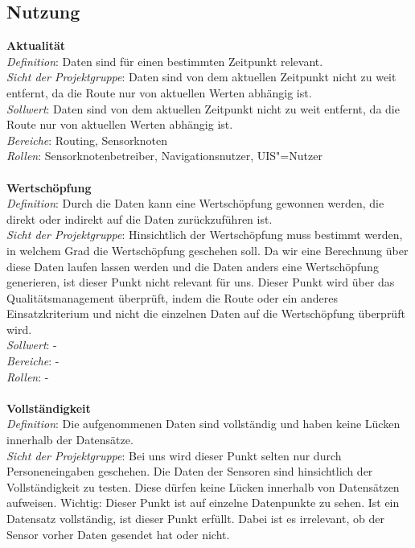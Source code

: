\subsection{Nutzung}
\textbf{Aktualität}\\
\textit{Definition}: Daten sind für einen bestimmten Zeitpunkt relevant. \\
\textit{Sicht der Projektgruppe}: Daten sind von dem aktuellen Zeitpunkt nicht zu weit entfernt, da die Route nur von aktuellen Werten abhängig ist.  \\
\textit{Sollwert}: Daten sind von dem aktuellen Zeitpunkt nicht zu weit entfernt, da die Route nur von aktuellen Werten abhängig ist. \\
\textit{Bereiche}: Routing, Sensorknoten\\
\textit{Rollen}: Sensorknotenbetreiber, Navigationsnutzer, UIS"=Nutzer\\
\\
\textbf{Wertschöpfung}\\
\textit{Definition}: Durch die Daten kann eine Wertschöpfung gewonnen werden, die direkt oder indirekt auf die Daten zurückzuführen ist. \\
\textit{Sicht der Projektgruppe}: Hinsichtlich der Wertschöpfung muss bestimmt werden, in welchem Grad die Wertschöpfung geschehen soll. Da wir eine Berechnung über diese Daten laufen lassen werden und die Daten anders eine Wertschöpfung generieren, ist dieser Punkt nicht relevant für uns. Dieser Punkt wird über das Qualitätsmanagement überprüft, indem die Route oder ein anderes Einsatzkriterium und nicht die einzelnen Daten auf die Wertschöpfung überprüft wird.  \\
\textit{Sollwert}: - \\
\textit{Bereiche}: - \\
\textit{Rollen}: - \\
\\
\textbf{Vollständigkeit}\\
\textit{Definition}: Die aufgenommenen Daten sind vollständig und haben keine Lücken innerhalb der Datensätze.  \\
\textit{Sicht der Projektgruppe}: Bei uns wird dieser Punkt selten nur durch Personeneingaben geschehen. Die Daten der Sensoren sind hinsichtlich der Vollständigkeit zu testen. Diese dürfen keine Lücken innerhalb von Datensätzen aufweisen. 
Wichtig: Dieser Punkt ist auf einzelne Datenpunkte zu sehen. Ist ein Datensatz vollständig, ist dieser Punkt erfüllt. Dabei ist es irrelevant, ob der Sensor vorher Daten gesendet hat oder nicht. \\
